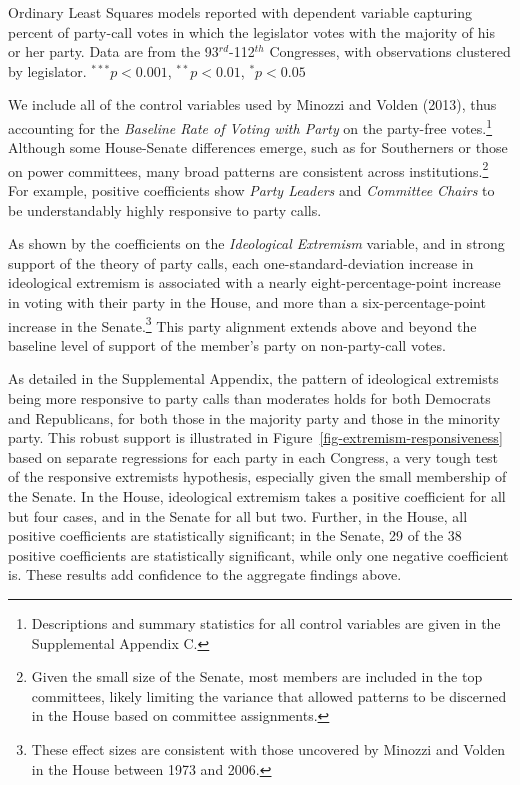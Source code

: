 \documentclass[12pt]{article}
\begin{document}
\begin{table}[!htbp]
\begin{threeparttable}
\begin{tablenotes}
   \item
   Ordinary Least Squares models reported with dependent variable capturing percent of party-call votes in which the legislator votes with the majority of his or her party. Data are from the 93$^{rd}$-112$^{th}$ Congresses, with observations clustered by legislator.
   $^{***}p<0.001$, $^{**}p<0.01$, $^*p<0.05$
 \end{tablenotes}
\end{threeparttable}
\end{table}

We include all of the control variables used by Minozzi and Volden (2013), thus accounting for the \textit{Baseline Rate of Voting with Party} on the party-free votes.\footnote{\doublespacing\normalsize Descriptions and summary statistics for all control variables are given in the Supplemental Appendix C.} Although some House-Senate differences emerge, such as for Southerners or those on power committees, many broad patterns are consistent across institutions.\footnote{\doublespacing\normalsize Given the small size of the Senate, most members are included in the top committees, likely limiting the variance that allowed patterns to be discerned in the House based on committee assignments.} For example, positive coefficients show \textit{Party Leaders} and \textit{Committee Chairs} to be understandably highly responsive to party calls.

As shown by the coefficients on the \textit{Ideological Extremism} variable, and in strong support of the theory of party calls, each one-standard-deviation increase in ideological extremism is associated with a nearly eight-percentage-point increase in voting with their party in the House, and more than a six-percentage-point increase in the Senate.\footnote{\doublespacing\normalsize These effect sizes are consistent with those uncovered by Minozzi and Volden in the House between 1973 and 2006.} This party alignment extends above and beyond the baseline level of support of the member's party on non-party-call votes.

As detailed in the Supplemental Appendix, the pattern of ideological extremists being more responsive to party calls than moderates holds for both Democrats and Republicans, for both those in the majority party and those in the minority party. This robust support is illustrated in Figure~\ref{fig-extremism-responsiveness} based on separate regressions for each party in each Congress, a very tough test of the responsive extremists hypothesis, especially given the small membership of the Senate. In the House, ideological extremism takes a positive coefficient for all but four cases, and in the Senate for all but two. Further, in the House, all positive coefficients are statistically significant; in the Senate, 29 of the 38 positive coefficients are statistically significant, while only one negative coefficient is. These results add confidence to the aggregate findings above.
\end{document}
